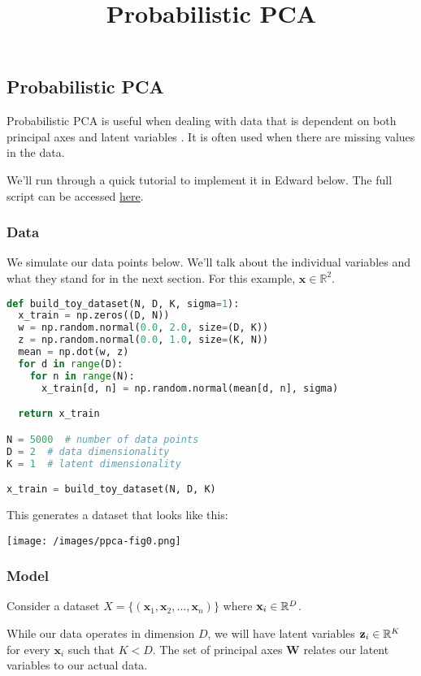 \newcommand{\R}{ \mbox{${\Bbb R}$}}


\title{Probabilistic PCA}

\subsection{Probabilistic PCA}

Probabilistic PCA is useful when dealing with data that is dependent on both principal axes and latent variables \citep{Tipping99probabilisticprincipal}. It is often used when there are missing values in the data.

We'll run through a quick tutorial to implement it in Edward below. The full script can be accessed
\href{https://github.com/blei-lab/edward/blob/master/examples/probabilistic_pca.py}
{here}.

\subsubsection{Data}

We simulate our data points below. We'll talk about the individual variables and what they stand for in the next section. For this example, $\mathbf{x}\in\mathbb{R}^2$.
\begin{lstlisting}[language=Python]
def build_toy_dataset(N, D, K, sigma=1):
  x_train = np.zeros((D, N))
  w = np.random.normal(0.0, 2.0, size=(D, K))
  z = np.random.normal(0.0, 1.0, size=(K, N))
  mean = np.dot(w, z)
  for d in range(D):
    for n in range(N):
      x_train[d, n] = np.random.normal(mean[d, n], sigma)

  return x_train

N = 5000  # number of data points
D = 2  # data dimensionality
K = 1  # latent dimensionality

x_train = build_toy_dataset(N, D, K)
\end{lstlisting}

This generates a dataset that looks like this:

\texttt{[image: /images/ppca-fig0.png]}

\subsubsection{Model}

Consider a dataset $X = \{(\mathbf{x}_1, \mathbf{x}_2,\ldots , \mathbf{x}_n)\}$ where $\mathbf{x}_i \in \Bbb{R}^D$.

While our data operates in dimension $D$, we will have latent variables $\mathbf{z}_i \in \Bbb{R}^K$ for every $\mathbf{x}_i$ such that $K < D$. The set of principal axes $\mathbf{W}$ relates our latent variables to our actual data.

